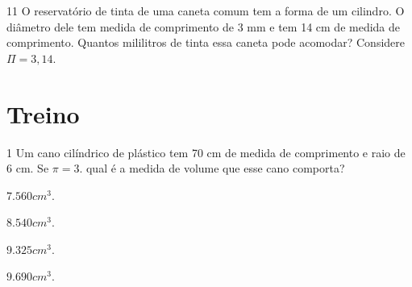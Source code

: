 {{{{


\num{11} O reservatório de tinta de uma caneta comum tem a forma de um
cilindro. O diâmetro dele tem medida de comprimento de 3 mm e tem 14 cm
de medida de comprimento. Quantos mililitros de tinta essa caneta pode
acomodar? Considere $\Pi = 3,14$.





\section*{Treino}

\num{1} Um cano cilíndrico de plástico tem 70 cm de medida de comprimento e
raio de 6 cm. Se $\pi = 3$. qual é a medida de volume que esse cano comporta?

\begin{escolha}[itemsep=0pt]
\item $7.560 cm^3$.
\item $8.540 cm^3$.
\item $9.325 cm^3$.
\item $9.690 cm^3$.
\end{escolha}










}}}}

